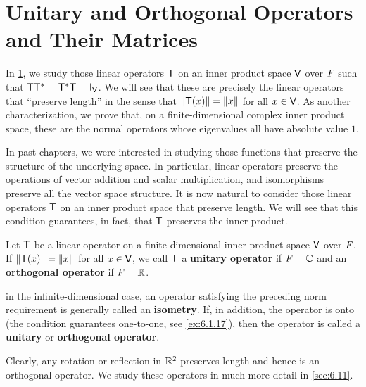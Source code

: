 \section{Unitary and Orthogonal Operators and Their Matrices}\label{sec:6.5}

\begin{note}
  In \cref{sec:6.5}, we study those linear operators \(\mathsf{T}\) on an inner product space \(\mathsf{V}\) over \(\mathit{F}\) such that \(\T \T^* = \T^* \T = \IT[\V]\).
  We will see that these are precisely the linear operators that ``preserve length'' in the sense that \(\left\lVert\mathsf{T}(x)\right\rVert = \left\lVert x\right\rVert\) for all \(x \in \mathsf{V}\).
  As another characterization, we prove that, on a finite-dimensional complex inner product space, these are the normal operators whose eigenvalues all have absolute value \(1\).

  In past chapters, we were interested in studying those functions that preserve the structure of the underlying space.
  In particular, linear operators preserve the operations of vector addition and scalar multiplication, and isomorphisms preserve all the vector space structure.
  It is now natural to consider those linear operators \(\mathsf{T}\) on an inner product space that preserve length.
  We will see that this condition guarantees, in fact, that \(\mathsf{T}\) preserves the inner product.
\end{note}

\begin{defn}\label{6.5.1}
  Let \(\mathsf{T}\) be a linear operator on a finite-dimensional inner product space \(\mathsf{V}\) over \(\mathit{F}\).
  If \(\left\lVert\mathsf{T}(x)\right\rVert = \left\lVert x\right\rVert\) for all \(x \in \mathsf{V}\), we call \(\mathsf{T}\) a \textbf{unitary operator} if \(\mathit{F} = \mathbb{C}\) and an \textbf{orthogonal operator} if \(\mathit{F} = \mathbb{R}\).

  in the infinite-dimensional case, an operator satisfying the preceding norm requirement is generally called an \textbf{isometry}.
  If, in addition, the operator is onto (the condition guarantees one-to-one, see \cref{ex:6.1.17}), then the operator is called a \textbf{unitary} or \textbf{orthogonal operator}.
\end{defn}

\begin{note}
  Clearly, any rotation or reflection in \(\mathbb{R}^2\) preserves length and hence is an orthogonal operator.
  We study these operators in much more detail in \cref{sec:6.11}.
\end{note}


